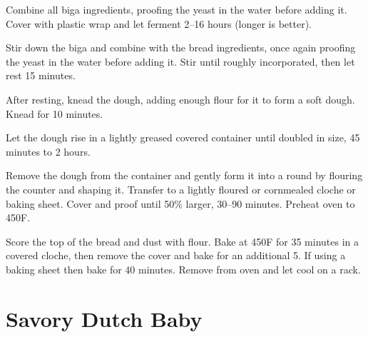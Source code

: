 \documentclass[oneside]{book}  %
\def\thisrecipe{}  %
\newcommand{\recipe}[1]{\section{#1}\def\thisrecipe{: #1}} %
\newcommand{\degF}{\textdegree F\xspace}
\begin{document}
\begin{directions}
  \item Combine all biga ingredients, proofing the yeast in the water before
  adding it. Cover with plastic wrap and let ferment 2--16 hours (longer is
  better).

  \item Stir down the biga and combine with the bread ingredients, once again
  proofing the yeast in the water before adding it. Stir until roughly
  incorporated, then let rest 15 minutes.

  \item After resting, knead the dough, adding enough flour for it to form a
  soft dough. Knead for 10 minutes.

  \item Let the dough rise in a lightly greased covered container until doubled
  in size, 45 minutes to 2 hours.

  \item Remove the dough from the container and gently form it into a round by
  flouring the counter and shaping it. Transfer to a lightly floured or
  cornmealed cloche or baking sheet. Cover and proof until 50\% larger, 30--90
  minutes. Preheat oven to 450\degF.

  \item Score the top of the bread and dust with flour. Bake at 450\degF for 35
  minutes in a covered cloche, then remove the cover and bake for an additional
  5. If using a baking sheet then bake for 40 minutes. Remove from oven and let
  cool on a rack.
\end{directions}
\recipe{Savory Dutch Baby} \label{recipe:savory_dutch_baby} %
\end{document}
